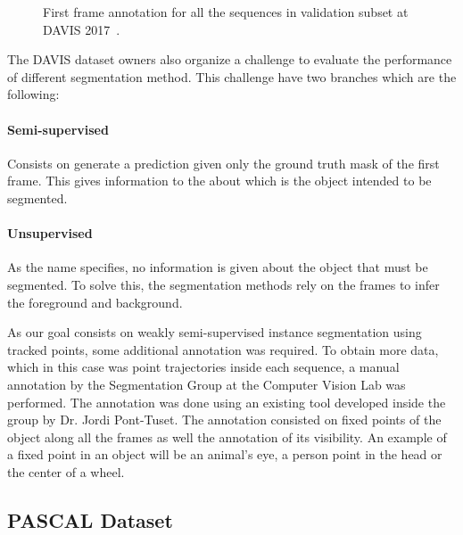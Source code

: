 \begin{figure}[h]
  \centering
  \caption{First frame annotation for all the sequences in validation subset at DAVIS 2017~\davislast.}
  \label{fig:davis}
\end{figure}


The DAVIS dataset owners also organize a challenge to evaluate the performance of different segmentation method.
This challenge have two branches which are the following:

\paragraph{Semi-supervised}

Consists on generate a prediction given only the ground truth mask of the first frame.
This gives information to the about which is the object intended to be segmented.

\paragraph{Unsupervised}

As the name specifies, no information is given about the object that must be segmented.
To solve this, the segmentation methods rely on the frames to infer the foreground and background.

As our goal consists on weakly semi-supervised instance segmentation using tracked points, some additional annotation was required.
To obtain more data, which in this case was point trajectories inside each sequence, a manual annotation by the Segmentation Group at the Computer Vision Lab was performed.
The annotation was done using an existing tool developed inside the group by Dr. Jordi Pont-Tuset.
The annotation consisted on fixed points of the object along all the frames as well the annotation of its visibility.
An example of a fixed point in an object will be an animal's eye, a person point in the head or the center of a wheel.

\subsection{PASCAL Dataset}


